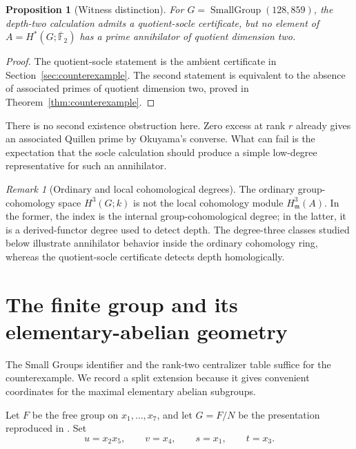 \documentclass[11pt]{amsart}
\newtheorem{proposition}[theorem]{Proposition}
\theoremstyle{definition}
\theoremstyle{remark}
\newtheorem{remark}[theorem]{Remark}
\newcommand{\kbar}{\overline{\mathbb F}_{2}}
\newcommand{\SG}[2]{\operatorname{SmallGroup}(#1,#2)}
\begin{document}
\begin{proposition}[Witness distinction]
\label{prop:witness-mismatch}
For $G=\SG{128}{859}$, the depth-two calculation admits a quotient-socle certificate, but no element of $A=H^*(G;\kbar)$ has a prime annihilator of quotient dimension two.
\end{proposition}

\begin{proof}
The quotient-socle statement is the ambient certificate in Section~\ref{sec:counterexample}.  The second statement is equivalent to the absence of associated primes of quotient dimension two, proved in Theorem~\ref{thm:counterexample}.
\end{proof}

There is no second existence obstruction here.  Zero excess at rank $r$ already gives an associated Quillen prime by Okuyama's converse.  What can fail is the expectation that the socle calculation should produce a simple low-degree representative for such an annihilator.

\begin{remark}[Ordinary and local cohomological degrees]
The ordinary group-cohomology space $H^3(G;k)$ is not the local cohomology module $H^3_{\mathfrak m}(A)$.  In the former, the index is the internal group-cohomological degree; in the latter, it is a derived-functor degree used to detect depth.  The degree-three classes studied below illustrate annihilator behavior inside the ordinary cohomology ring, whereas the quotient-socle certificate detects depth homologically.
\end{remark}

\section{The finite group and its elementary-abelian geometry}
\label{sec:group}

The Small Groups identifier and the rank-two centralizer table suffice for the counterexample.  We record a split extension because it gives convenient coordinates for the maximal elementary abelian subgroups.

Let \(F\) be the free group on \(x_1,\dots,x_7\), and let \(G=F/N\) be the presentation reproduced in \cite[Appendix~A.1]{DaiEtAl2026}.  Set
\[
u=x_2x_5,\qquad v=x_4,
\qquad s=x_1,\qquad t=x_3.
\]
\end{document}
